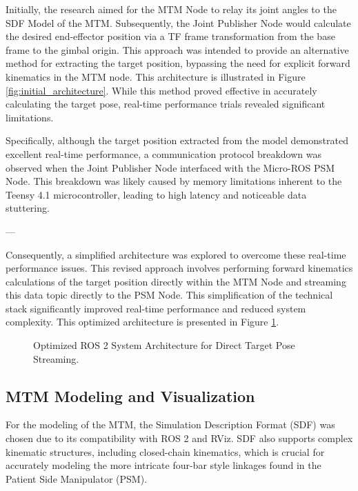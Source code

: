 Initially, the research aimed for the MTM Node to relay its joint angles to the SDF Model of the MTM. Subsequently, the Joint Publisher Node would calculate the desired end-effector position via a TF frame transformation from the base frame to the gimbal origin. This approach was intended to provide an alternative method for extracting the target position, bypassing the need for explicit forward kinematics in the MTM node. This architecture is illustrated in Figure \ref{fig:initial_architecture}. While this method proved effective in accurately calculating the target pose, real-time performance trials revealed significant limitations.

Specifically, although the target position extracted from the model demonstrated excellent real-time performance, a communication protocol breakdown was observed when the Joint Publisher Node interfaced with the Micro-ROS PSM Node. This breakdown was likely caused by memory limitations inherent to the Teensy 4.1 microcontroller, leading to high latency and noticeable data stuttering.

---

Consequently, a simplified architecture was explored to overcome these real-time performance issues. This revised approach involves performing forward kinematics calculations of the target position directly within the MTM Node and streaming this data topic directly to the PSM Node. This simplification of the technical stack significantly improved real-time performance and reduced system complexity. This optimized architecture is presented in Figure \ref{fig:optimized_architecture}.

\begin{figure}[h!]
    \centering
    \caption{Optimized ROS 2 System Architecture for Direct Target Pose Streaming.}
    \label{fig:optimized_architecture}
\end{figure}

\subsection{MTM Modeling and Visualization}

For the modeling of the MTM, the Simulation Description Format (SDF) was chosen due to its compatibility with ROS 2 and RViz. SDF also supports complex kinematic structures, including closed-chain kinematics, which is crucial for accurately modeling the more intricate four-bar style linkages found in the Patient Side Manipulator (PSM).

